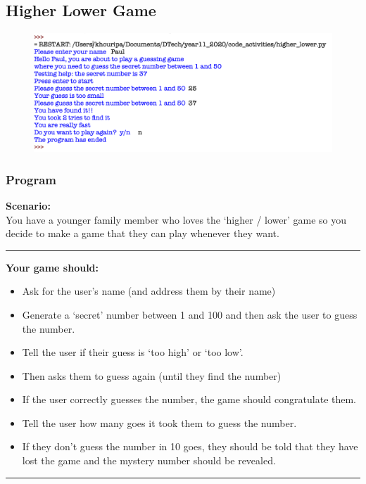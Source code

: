 \documentclass[a4paper,12pt]{article}
\begin{document}
\newpage
\subsection{Higher Lower Game}
\begin{figure} [!h]
	\centering
	\includegraphics[width=17cm]{screen_shots/higher_lower.png}
\end{figure}
\subsubsection{Program}

\textbf{Scenario:}\\
You have a younger family member who loves the ‘higher / lower’ game so you decide to make a game that they can play whenever they want.\\
\hrule\vspace{0.5cm}
\textbf{Your game should:}
\begin{itemize}
	\item Ask for the user’s name (and address them by their name)
	\item Generate a ‘secret’ number between 1 and 100 and then ask the user to guess the number.
	\item Tell the user if their guess is ‘too high’ or ‘too low’.
	\item Then asks them to guess again (until they find the number)
	\item If the user correctly guesses the number, the game should congratulate them.
	\item Tell the user how many goes it took them to guess the number.
	\item If they don’t guess the number in 10 goes, they should be told that they have lost the game and the mystery number should be revealed.
\end{itemize}

\hrule\vspace{0.5cm}
\end{document}
